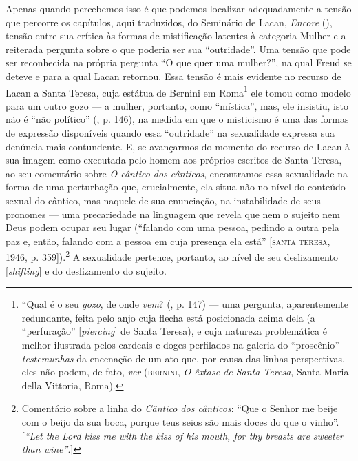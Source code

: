 Apenas quando percebemos isso é que podemos localizar adequadamente a
tensão que percorre os capítulos, aqui traduzidos, do Seminário  de
Lacan, \emph{Encore} (), tensão entre sua crítica às formas de
mistificação latentes à categoria Mulher e a reiterada pergunta sobre o
que poderia ser sua ``outridade''. Uma tensão que pode ser reconhecida
na própria pergunta ``O que quer uma mulher?'', na qual Freud se deteve
e para a qual Lacan retornou. Essa tensão é mais evidente no recurso de
Lacan a Santa Teresa, cuja estátua de Bernini em Roma\footnote{``Qual é
  o seu \emph{gozo}, de onde \emph{vem}? (, p. 147) --- uma
  pergunta, aparentemente redundante, feita pelo anjo cuja flecha está
  posicionada acima dela (a ``perfuração'' {[}\emph{piercing}{]} de
  Santa Teresa), e cuja natureza problemática é melhor ilustrada pelos
  cardeais e doges perfilados na galeria do ``proscênio'' ---
  \emph{testemunhas} da encenação de um ato que, por causa das linhas
  perspectivas, eles não podem, de fato, \emph{ver} (\textsc{bernini}, \emph{O
  êxtase de Santa Teresa}, Santa Maria della Vittoria, Roma).} ele tomou
como modelo para um outro gozo --- a mulher, portanto, como ``mística'',
mas, ele insistiu, isto não é ``não político'' (, p. 146), na
medida em que o misticismo é uma das formas de expressão disponíveis
quando essa ``outridade'' na sexualidade expressa sua denúncia mais
contundente. E, se avançarmos do momento do recurso de Lacan à sua
imagem como executada pelo homem aos próprios escritos de Santa Teresa,
ao seu comentário sobre \emph{O cântico dos cânticos}, encontramos essa
sexualidade na forma de uma perturbação que, crucialmente, ela situa não
no nível do conteúdo sexual do cântico, mas naquele de sua enunciação,
na instabilidade de seus pronomes --- uma precariedade na linguagem que
revela que nem o sujeito nem Deus podem ocupar seu lugar (``falando com
uma pessoa, pedindo a outra pela paz e, então, falando com a pessoa em
cuja presença ela está'' [\textsc{santa teresa}, 1946, p. 359]).\footnote{Comentário
  sobre a linha do \emph{Cântico dos cânticos}: ``Que o Senhor me beije com
  o beijo da sua boca, porque teus seios são mais doces do que o
  vinho''. {[}\emph{``Let the Lord kiss me with the kiss of his mouth,
  for thy breasts are sweeter than wine''}.{]}} A sexualidade pertence,
portanto, ao nível de seu deslizamento {[}\emph{shifting}{]} e do
deslizamento do sujeito.

